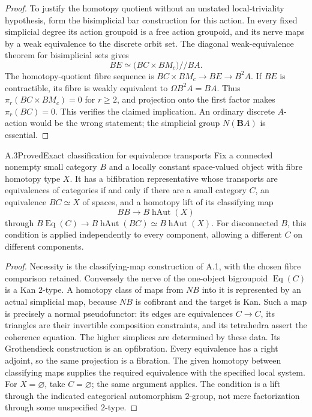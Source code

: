 \begin{proof}
To justify the homotopy quotient without an unstated local-triviality hypothesis, form the bisimplicial bar construction for this action. In every fixed simplicial degree its action groupoid is a free action groupoid, and its nerve maps by a weak equivalence to the discrete orbit set. The diagonal weak-equivalence theorem for bisimplicial sets gives
\[
 B E\simeq \bigl(BC\times B M_c\bigr)\mathbin{//}BA.
\]
The homotopy-quotient fibre sequence is
$BC\times BM_c\to BE\to B^2A$. If $BE$ is contractible, its fibre is weakly equivalent to $\Omega B^2A=BA$. Thus $\pi_r(BC\times BM_c)=0$ for $r\geq2$, and projection onto the first factor makes $\pi_r(BC)=0$. This verifies the claimed implication. An ordinary discrete $A$-action would be the wrong statement; the simplicial group $N(\mathbf BA)$ is essential.
\end{proof}

\begin{result}{A.3}{Proved}{Exact classification for equivalence transports}
Fix a connected nonempty small category $B$ and a locally constant space-valued object with fibre homotopy type $X$. It has a bifibration representative whose transports are equivalences of categories if and only if there are a small category $C$, an equivalence $BC\simeq X$ of spaces, and a homotopy lift of its classifying map
\[
 BB\longrightarrow B\operatorname{hAut}(X)
\]
through $B\operatorname{Eq}(C)\to B\operatorname{hAut}(BC)\simeq B\operatorname{hAut}(X)$. For disconnected $B$, this condition is applied independently to every component, allowing a different $C$ on different components.
\end{result}
\begin{proof}
Necessity is the classifying-map construction of A.1, with the chosen fibre comparison retained. Conversely the nerve of the one-object bigroupoid $\operatorname{Eq}(C)$ is a Kan $2$-type. A homotopy class of maps from $NB$ into it is represented by an actual simplicial map, because $NB$ is cofibrant and the target is Kan. Such a map is precisely a normal pseudofunctor: its edges are equivalences $C\to C$, its triangles are their invertible composition constraints, and its tetrahedra assert the coherence equation. The higher simplices are determined by these data. Its Grothendieck construction is an opfibration. Every equivalence has a right adjoint, so the same projection is a fibration. The given homotopy between classifying maps supplies the required equivalence with the specified local system. For $X=\varnothing$, take $C=\varnothing$; the same argument applies. The condition is a lift through the indicated categorical automorphism $2$-group, not mere factorization through some unspecified $2$-type.
\end{proof}

